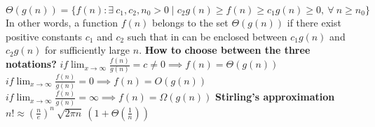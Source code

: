 \documentclass[14pt]{article}
\begin{document}
$\Theta(g(n)) = \{f(n) : \exists \ c_1, c_2, n_0 > 0 \mid c_2 g(n) \geq f(n) \geq c_1 g(n) \geq 0, \ \forall \ n \geq n_0\}$ \newline \newline
In other words, a function $f(n)$ belongs to the set $\Theta(g(n))$ if there exist positive constants $c_1$ and $c_2$
such that in can be enclosed between $c_1 g(n)$ and $c_2 g(n)$ for sufficiently large $n$. \newpage
\hspace*{-8mm} \textbf{How to choose between the three notations?} \newline \newline
$if \displaystyle{\lim_{x \to \infty}} \frac{f(n)}{g(n)} = c \neq 0 \implies f(n) = \Theta(g(n))$ \newline
$if \displaystyle{\lim_{x \to \infty}} \frac{f(n)}{g(n)} = 0 \implies f(n) = O(g(n))$ \newline
$if \displaystyle{\lim_{x \to \infty}} \frac{f(n)}{g(n)} = \infty \implies f(n) = \Omega(g(n))$ \newline \newline \newline
\textbf{Stirling's approximation} \newline \newline
$n! \approx (\frac{n}{e})^n \ \sqrt{2 \pi n} \ (1 + \Theta(\frac{1}{n}))$
\end{document}
